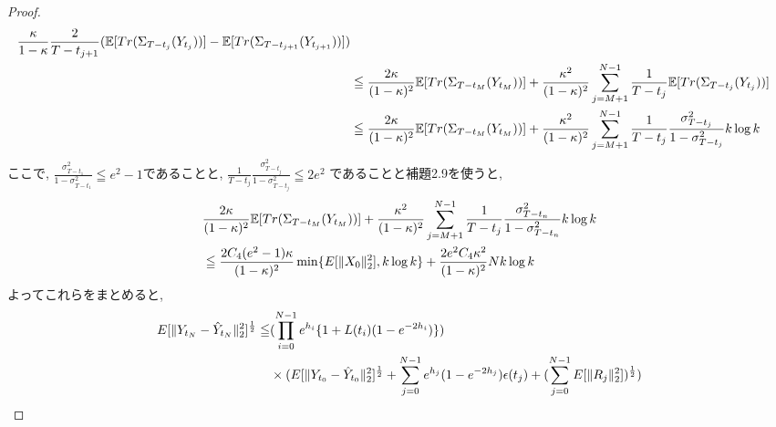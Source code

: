 \documentclass[11pt,a4paper]{ltjsarticle}
\theoremstyle{remark}
\begin{document}
\begin{proof}
\begin{align}
        \frac{\kappa}{1-\kappa}
        \frac{2}{T-{t_{j+1}}}
        (\mathbb{E}[Tr(\Sigma_{T-t_j}(Y_{t_j}))]-\mathbb{E}[Tr(\Sigma_{T-{t_{j+1}}}(Y_{t_{j+1}}))])
         \notag\\
        &\leqq 
        \frac{2\kappa}{(1-\kappa)^2}
        \mathbb{E}[Tr(\Sigma_{T-t_M}(Y_{t_M}))]+
        \frac{\kappa^2}{(1-\kappa)^2}
        \sum_{j=M+1}^{N-1}
        \frac{1}{T-t_j}
        \mathbb{E}[Tr(\Sigma_{T-t_j}(Y_{t_j}))] \notag\\
        &\leqq 
        \frac{2\kappa}{(1-\kappa)^2}
        \mathbb{E}[Tr(\Sigma_{T-t_M}(Y_{t_M}))]+
        \frac{\kappa^2}{(1-\kappa)^2}
        \sum_{j=M+1}^{N-1}
        \frac{1}{T-t_j}
        \frac{\sigma^2_{T-t_j}}{1-\sigma^2_{T-t_j}}k\log{k}
    \end{align}
    ここで, $\frac{\sigma^2_{T-{t_1}}}{1-\sigma^2_{T-{t_1}}}\leqq e^2-1$であることと, $\frac{1}{T-t_j}
        \frac{\sigma^2_{T-t_j}}{1-\sigma^2_{T-t_j}}\leqq 2e^2$ であることと補題2.9を使うと, 
    \begin{align}
        &\frac{2\kappa}{(1-\kappa)^2}
        \mathbb{E}[Tr(\Sigma_{T-t_M}(Y_{t_M}))]+
        \frac{\kappa^2}{(1-\kappa)^2}
        \sum_{j=M+1}^{N-1}
        \frac{1}{T-t_j}
        \frac{\sigma^2_{T-t_n}}{1-\sigma^2_{T-t_n}}k\log{k}
        \notag\\
        &\leqq
        \frac{2C_4(e^2-1)\kappa}{(1-\kappa)^2}\min\{E[\|X_0\|^2_2],k\log{k}\}+
        \frac{2e^2C_4\kappa^2}{(1-\kappa)^2}Nk\log{k}
    \end{align}
    よってこれらをまとめると, 
    \begin{align}
        E[\|Y_{t_{N}}-\hat{Y}_{t_{N}}\|^2_2]^\frac{1}{2}\leqq& (\prod_{i=0}^{N-1}e^{h_i}\{1+L(t_i)(1-e^{-2h_i})\})\notag\\
        &\times(E[\|
            Y_{t_0}-\hat{Y}_{t_0}
        \|^2_2]^{\frac{1}{2}}+\sum_{j=0}^{N-1}e^{h_j}(1-e^{-2h_j})
        \epsilon(t_j)+(\sum_{j=0}^{N-1}E[\|R_j\|^2_2])^\frac{1}{2})
    \end{align}
\end{proof}
\end{document}
